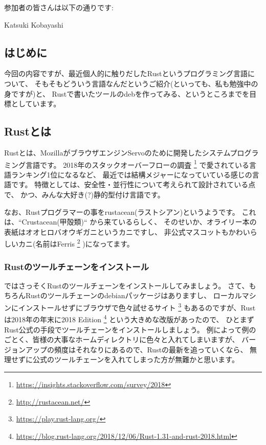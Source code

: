 \documentclass[mingoth,a4paper]{jsarticle}
\begin{document}

参加者の皆さんは以下の通りです:
\begin{prework}{Katsuki Kobayashi}
\end{prework}


\subsection{はじめに}

今回の内容ですが、最近個人的に触りだしたRustというプログラミング言語について、
そもそもどういう言語なんだというご紹介(といっても、私も勉強中の身ですが)と、
Rustで書いたツールのdebを作ってみる、というところまでを目標としています。

\subsection{Rustとは}

Rustとは、MozillaがブラウザエンジンServoのために開発したシステムプログラミング言語です。
2018年のスタックオーバーフローの調査%
\footnote{\url{https://insights.stackoverflow.com/survey/2018}}%
で愛されている言語ランキング1位になるなど、
最近では結構メジャーになっていている感じの言語です。
特徴としては、安全性・並行性について考えられて設計されている点で、
かつ、みんな大好き(?)静的型付け言語です。

なお、Rustプログラマーの事をrustacean(ラストシアン)というようです。
これは、``Crustacean(甲殻類)`` から来ているらしく、
そのせいか、オライリー本の表紙はオオヒロバオウギガニというカニですし、
非公式マスコットもかわいらしいカニ(名前はFerris%
\footnote{\url{http://rustacean.net/}}%
)になってます。

\subsubsection{Rustのツールチェーンをインストール}

ではさっそくRustのツールチェーンをインストールしてみましょう。
さて、もちろんRustのツールチェーンのdebianパッケージはありますし、
ローカルマシンにインストールせずにブラウザで色々試せるサイト%
\footnote{\url{https://play.rust-lang.org/}}
もあるのですが、Rustは2018年の年末に2018 Edition%
\footnote{\url{https://blog.rust-lang.org/2018/12/06/Rust-1.31-and-rust-2018.html}}%
という大きめな改版があったので、
ひとまずRust公式の手段でツールチェーンをインストールしましょう。
例によって例のごとく、皆様の大事なホームディレクトリに色々と入れてしまいますが、
バージョンアップの頻度はそれなりにあるので、Rustの最新を追っていくなら、
無理せずに公式のツールチェーンを入れてしまった方が無難かと思います。
\end{document}

